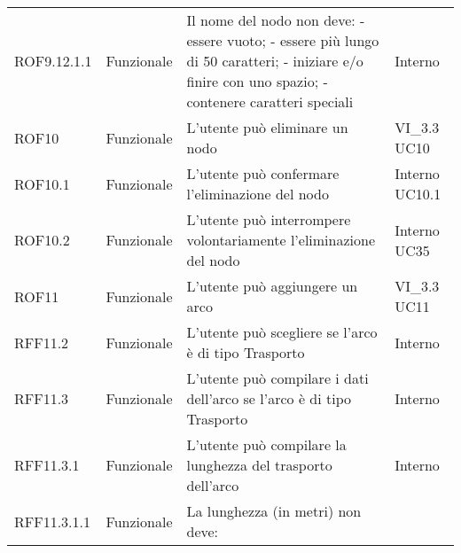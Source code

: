 \begin{longtable}{p{2cm}!{\VRule[1pt]}p{2cm}!{\VRule[1pt]}p{5cm}!{\VRule[1pt]}p{1.5cm}}
	ROF9.12.1.1&Funzionale\newline  & Il nome del nodo non deve:
	- essere vuoto;
	- essere più lungo di 50 caratteri;
	- iniziare e/o finire con uno spazio;
	- contenere caratteri speciali & Interno \\
		ROF10                            & Funzionale\newline               & L'utente può eliminare un nodo                                                                                           & VI_3.3 \newline UC10         
	\\
	ROF10.1                          & Funzionale\newline               & L'utente può confermare l'eliminazione del nodo                                                                          & Interno \newline UC10.1      
	\\
	ROF10.2                          & Funzionale\newline               & L'utente può interrompere volontariamente l'eliminazione del nodo                                                        & Interno \newline UC35        
	\\
	ROF11                            & Funzionale\newline               & L'utente può aggiungere un arco                                                                                          & VI_3.3 \newline UC11         
	\\
	RFF11.2                          & Funzionale\newline               & L'utente può scegliere se l'arco è di tipo Trasporto                                                                    & Interno                      \\
	RFF11.3                          & Funzionale\newline               & L'utente può compilare i dati dell'arco se l'arco è di tipo Trasporto                                                   & Interno                      \\
	RFF11.3.1                        & Funzionale\newline               & L'utente può compilare la lunghezza del trasporto dell'arco                                                              & Interno                      \\
	RFF11.3.1.1&Funzionale\newline  & La lunghezza (in metri) non deve:

\end{longtable}
